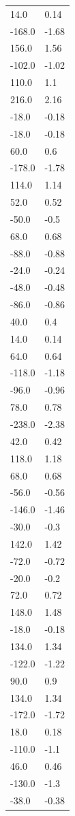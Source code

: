 \begin{longtable}{ll}
14.0 & 0.14 \\
-168.0 & -1.68 \\
156.0 & 1.56 \\
-102.0 & -1.02 \\
110.0 & 1.1 \\
216.0 & 2.16 \\
-18.0 & -0.18 \\
-18.0 & -0.18 \\
60.0 & 0.6 \\
-178.0 & -1.78 \\
114.0 & 1.14 \\
52.0 & 0.52 \\
-50.0 & -0.5 \\
68.0 & 0.68 \\
-88.0 & -0.88 \\
-24.0 & -0.24 \\
-48.0 & -0.48 \\
-86.0 & -0.86 \\
40.0 & 0.4 \\
14.0 & 0.14 \\
64.0 & 0.64 \\
-118.0 & -1.18 \\
-96.0 & -0.96 \\
78.0 & 0.78 \\
-238.0 & -2.38 \\
42.0 & 0.42 \\
118.0 & 1.18 \\
68.0 & 0.68 \\
-56.0 & -0.56 \\
-146.0 & -1.46 \\
-30.0 & -0.3 \\
142.0 & 1.42 \\
-72.0 & -0.72 \\
-20.0 & -0.2 \\
72.0 & 0.72 \\
148.0 & 1.48 \\
-18.0 & -0.18 \\
134.0 & 1.34 \\
-122.0 & -1.22 \\
90.0 & 0.9 \\
134.0 & 1.34 \\
-172.0 & -1.72 \\
18.0 & 0.18 \\
-110.0 & -1.1 \\
46.0 & 0.46 \\
-130.0 & -1.3 \\
-38.0 & -0.38 \\

\end{longtable}
